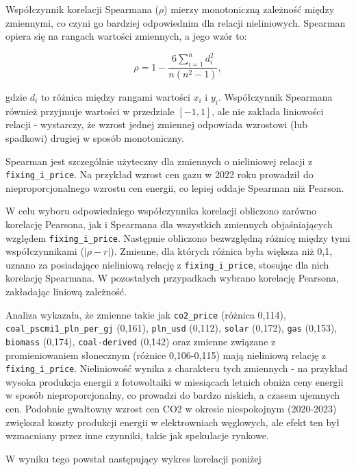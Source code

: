 Współczynnik korelacji Spearmana (\( \rho \)) mierzy monotoniczną zależność między zmiennymi, co czyni go bardziej odpowiednim dla relacji nieliniowych. Spearman opiera się na rangach wartości zmiennych, a jego wzór to:

\[
\rho = 1 - \frac{6 \sum_{i=1}^{n} d_i^2}{n(n^2 - 1)},
\]

gdzie \( d_i \) to różnica między rangami wartości \( x_i \) i \( y_i \). Współczynnik Spearmana również przyjmuje wartości w przedziale \([-1, 1]\), ale nie zakłada liniowości relacji - wystarczy, że wzrost jednej zmiennej odpowiada wzrostowi (lub spadkowi) drugiej w sposób monotoniczny.

Spearman jest szczególnie użyteczny dla zmiennych o nieliniowej relacji z \texttt{fixing\_i\_price}. Na przykład wzrost cen gazu w 2022 roku prowadził do nieproporcjonalnego wzrostu cen energii, co lepiej oddaje Spearman niż Pearson.

W celu wyboru odpowiedniego współczynnika korelacji obliczono zarówno korelację Pearsona, jak i Spearmana dla wszystkich zmiennych objaśniających względem \texttt{fixing\_i\_price}. Następnie obliczono bezwzględną różnicę między tymi współczynnikami (\(| \rho - r |\)). Zmienne, dla których różnica była większa niż 0,1, uznano za posiadające nieliniową relację z \texttt{fixing\_i\_price}, stosując dla nich korelację Spearmana. W pozostałych przypadkach wybrano korelację Pearsona, zakładając liniową zależność. 

Analiza wykazała, że zmienne takie jak \texttt{co2\_price} (różnica 0,114), \texttt{coal\_pscmi1\_pln\_per\_gj} (0,161), \texttt{pln\_usd} (0,112), \texttt{solar} (0,172), \texttt{gas} (0,153), \texttt{biomass} (0,174), \texttt{coal-derived} (0,142) oraz zmienne związane z promieniowaniem słonecznym (różnice 0,106-0,115) mają nieliniową relację z \texttt{fixing\_i\_price}. Nieliniowość wynika z charakteru tych zmiennych - na przykład wysoka produkcja energii z fotowoltaiki w miesiącach letnich obniża ceny energii w sposób nieproporcjonalny, co prowadzi do bardzo niskich, a czasem ujemnych cen. Podobnie gwałtowny wzrost cen CO2 w okresie niespokojnym (2020-2023) zwiększał koszty produkcji energii w elektrowniach węglowych, ale efekt ten był wzmacniany przez inne czynniki, takie jak spekulacje rynkowe.

W wyniku tego powstał następujący wykres korelacji poniżej

